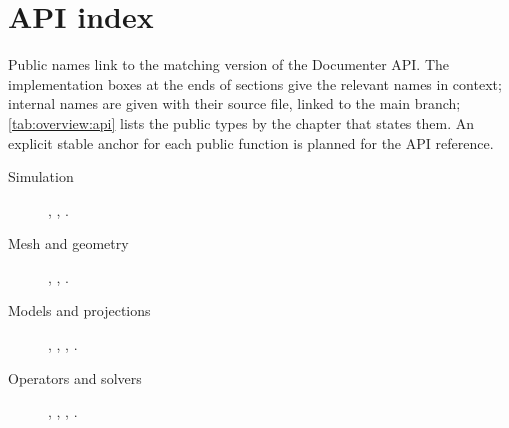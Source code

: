 \chapter{API index}\label{app:api-index}
Public names link to the matching version of the Documenter API. The
implementation boxes at the ends of sections give the relevant names in context;
internal names are given with their source file, linked to the main branch;
\cref{tab:overview:api} lists the public types by the chapter that states them.
An explicit stable anchor for each public function is planned for the API
reference.
\raggedright

\begin{description}
\item[Simulation] , , .
\item[Mesh and geometry] , ,
  .
\item[Models and projections] , ,
  , .
\item[Operators and solvers] , ,
  , .
\end{description}
